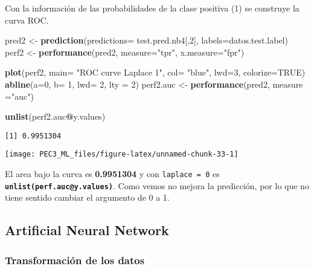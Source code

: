 \documentclass[
]{article}
\newenvironment{Shaded}{\begin{snugshade}}{\end{snugshade}}
\newcommand{\DataTypeTok}[1]{\textcolor[rgb]{0.13,0.29,0.53}{#1}}
\newcommand{\DecValTok}[1]{\textcolor[rgb]{0.00,0.00,0.81}{#1}}
\newcommand{\KeywordTok}[1]{\textcolor[rgb]{0.13,0.29,0.53}{\textbf{#1}}}
\newcommand{\NormalTok}[1]{#1}
\newcommand{\OperatorTok}[1]{\textcolor[rgb]{0.81,0.36,0.00}{\textbf{#1}}}
\newcommand{\OtherTok}[1]{\textcolor[rgb]{0.56,0.35,0.01}{#1}}
\newcommand{\StringTok}[1]{\textcolor[rgb]{0.31,0.60,0.02}{#1}}
\begin{document}
Con la información de las probabilidades de la clase positiva (1) se
construye la curva ROC.

\begin{Shaded}
\begin{Highlighting}[]
\NormalTok{pred2 <-}\StringTok{ }\KeywordTok{prediction}\NormalTok{(}\DataTypeTok{predictions=}\NormalTok{ test.pred.nb4[,}\DecValTok{2}\NormalTok{], }\DataTypeTok{labels=}\NormalTok{datos.test.label)}
\NormalTok{perf2 <-}\StringTok{ }\KeywordTok{performance}\NormalTok{(pred2, }\DataTypeTok{measure=}\StringTok{"tpr"}\NormalTok{, }\DataTypeTok{x.measure=}\StringTok{"fpr"}\NormalTok{)}

\KeywordTok{plot}\NormalTok{(perf2, }\DataTypeTok{main=} \StringTok{"ROC curve Laplace 1"}\NormalTok{, }\DataTypeTok{col=} \StringTok{"blue"}\NormalTok{, }\DataTypeTok{lwd=}\DecValTok{3}\NormalTok{, }\DataTypeTok{colorize=}\OtherTok{TRUE}\NormalTok{)}
\KeywordTok{abline}\NormalTok{(}\DataTypeTok{a=}\DecValTok{0}\NormalTok{, }\DataTypeTok{b=} \DecValTok{1}\NormalTok{, }\DataTypeTok{lwd=} \DecValTok{2}\NormalTok{, }\DataTypeTok{lty =} \DecValTok{2}\NormalTok{)}
\NormalTok{perf2.auc <-}\StringTok{ }\KeywordTok{performance}\NormalTok{(pred2, }\DataTypeTok{measure =}\StringTok{"auc"}\NormalTok{)}

\KeywordTok{unlist}\NormalTok{(perf2.auc}\OperatorTok{@}\NormalTok{y.values)}
\end{Highlighting}
\end{Shaded}

\begin{verbatim}
[1] 0.9951304
\end{verbatim}

\begin{center}\texttt{[image: PEC3\_ML\_files/figure-latex/unnamed-chunk-33-1]} \end{center}

El area bajo la curva es \textbf{0.9951304} y con \texttt{laplace\ =\ 0}
es \textbf{\texttt{unlist(perf.auc@y.values)}}. Como vemos no mejora la
predicción, por lo que no tiene sentido cambiar el argumento de 0 a 1.

\hypertarget{artificial-neural-network}{%
\subsection{Artificial Neural Network}\label{artificial-neural-network}}

\hypertarget{transformaciuxf3n-de-los-datos-2}{%
\subsubsection{Transformación de los
datos}\label{transformaciuxf3n-de-los-datos-2}}
\end{document}
